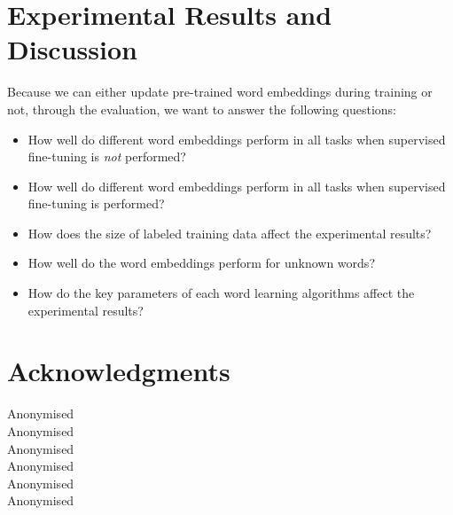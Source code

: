 \documentclass[11pt]{article}
\begin{document}


\section{Experimental Results and Discussion}



Because we can either update pre-trained word embeddings during training or not, through the evaluation, we want to answer the following questions:
\begin{itemize}
\item How well do different word embeddings perform in all tasks when supervised fine-tuning is \textit{not} performed?
\item How well do different word embeddings perform in all tasks when supervised fine-tuning is performed?
\item How does the size of labeled training data affect the experimental results?
\item How well do the word embeddings perform for unknown words? 
\item How do the key parameters of each word learning algorithms affect the experimental results?
\end{itemize}



\section*{Acknowledgments}

Anonymised\\
Anonymised\\
Anonymised\\
Anonymised\\
Anonymised\\
Anonymised\\




\end{document}
